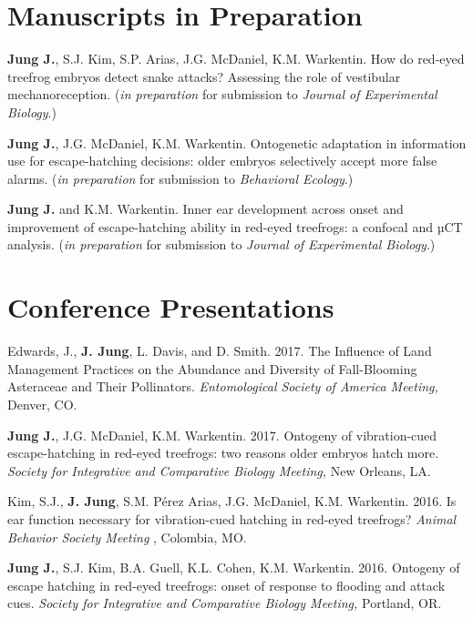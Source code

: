\documentclass[margin,line]{res}
\begin{document}
\begin{resume}
\section{\sc Manuscripts in Preparation}
{\bf Jung J.}, S.J. Kim, S.P. Arias, J.G. McDaniel, K.M. Warkentin. {How do red-eyed treefrog embryos detect snake attacks? Assessing the role of vestibular mechanoreception.} ({\it in preparation} for submission to {\it Journal of Experimental Biology}.)

\vspace{-.3cm}
{\bf Jung J.}, J.G. McDaniel, K.M. Warkentin. {Ontogenetic adaptation in information use for escape-hatching decisions: older embryos selectively accept more false alarms.} ({\it in preparation} for submission to {\it Behavioral Ecology}.)

\vspace{-.3cm}
{\bf Jung J.} and K.M. Warkentin. {Inner ear development across onset and improvement of escape-hatching ability in red-eyed treefrogs: a confocal and µCT analysis.} ({\it in preparation} for submission to {\it Journal of Experimental Biology}.)

\section{\sc Conference Presentations}

Edwards, J., {\bf J. Jung}, L. Davis, and D. Smith. {2017.} {The Influence of Land Management Practices on the Abundance and Diversity of Fall-Blooming Asteraceae and Their Pollinators.} {\it Entomological Society of America Meeting,} {Denver, CO.}

\vspace{-.25cm}
{\bf Jung J.}, J.G. McDaniel, K.M. Warkentin. {2017.} {Ontogeny of vibration-cued escape-hatching in red-eyed treefrogs: two reasons older embryos hatch more.} {\it Society for Integrative and Comparative Biology Meeting,} {New Orleans, LA.}

\vspace{-.25cm}
Kim, S.J., {\bf J. Jung}, S.M. Pérez Arias, J.G. McDaniel, K.M. Warkentin. {2016.} {Is ear function necessary for vibration-cued hatching in red-eyed treefrogs?} {\it Animal Behavior Society Meeting} {, Colombia, MO.}

\vspace{-.25cm}

{\bf Jung J.}, S.J. Kim, B.A. Guell, K.L. Cohen, K.M. Warkentin. {2016.} {Ontogeny of escape hatching in red-eyed treefrogs: onset of response to flooding and attack cues.} {\it Society for Integrative and Comparative Biology Meeting,} {Portland, OR.}


\end{resume}
\end{document}
